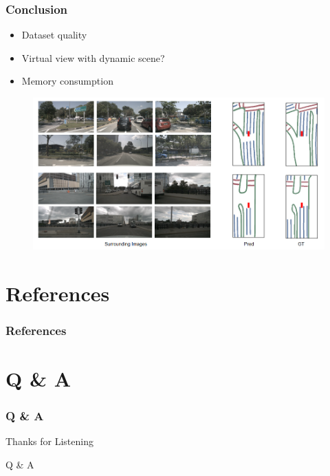 \documentclass[
	12pt, %
	aspectratio=169, %
]{beamer}
\begin{document}
\begin{frame}
	\frametitle{Conclusion}

	\begin{itemize}
		\item Dataset quality
		\item Virtual view with dynamic scene?
		\item Memory consumption
	\end{itemize}

	\begin{figure}
		\centering
		\includegraphics[width=0.7\linewidth]{"./Images/visualization.png"}
	\end{figure}
\end{frame}


\section{References}

\begin{frame}
	\frametitle{References}

	\printbibliography
\end{frame}


\section{Q \& A}

\begin{frame}
    \frametitle{Q \& A}
	\begin{center}
		{\Huge Thanks for Listening}
		
		\bigskip\bigskip %
		
		{\LARGE Q \& A}

	\end{center}
\end{frame}

\end{document}
